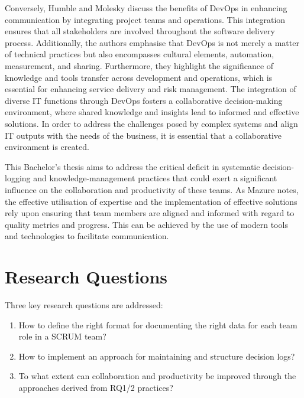 Conversely, Humble and Molesky \cite{HumbleMolesky2011} discuss the benefits of \ac{DevOps} in enhancing communication by integrating project teams and operations. This integration ensures that all stakeholders are involved throughout the software delivery process. Additionally, the authors emphasise that \ac{DevOps} is not merely a matter of technical practices but also encompasses cultural elements, automation, measurement, and sharing. Furthermore, they highlight the significance of knowledge and tools transfer across development and operations, which is essential for enhancing service delivery and risk management. The integration of diverse \ac{IT} functions through \ac{DevOps} fosters a collaborative decision-making environment, where shared knowledge and insights lead to informed and effective solutions. In order to address the challenges posed by complex systems and align \ac{IT} outputs with the needs of the business, it is essential that a collaborative environment is created.

This Bachelor's thesis aims to address the critical deficit in systematic decision-logging and knowledge-management practices that could exert a significant influence on the collaboration and productivity of these teams. As Mazure \cite{Mazur2023} notes, the effective utilisation of expertise and the implementation of effective solutions rely upon ensuring that team members are aligned and informed with regard to quality metrics and progress. This can be achieved by the use of modern tools and technologies to facilitate communication.

\section{Research Questions}

Three key research questions are addressed:

\begin{enumerate}[start=1,label={(\bfseries R\arabic*):}]
\item How to define the right format for documenting the right data for each team role in a \ac{SCRUM} team? \label{RQ1}
\item How to implement an approach for maintaining and structure decision logs? \label{RQ2}
\item To what extent can collaboration and productivity be improved through the approaches derived from RQ1/2 practices? \label{RQ3}
\end{enumerate}

